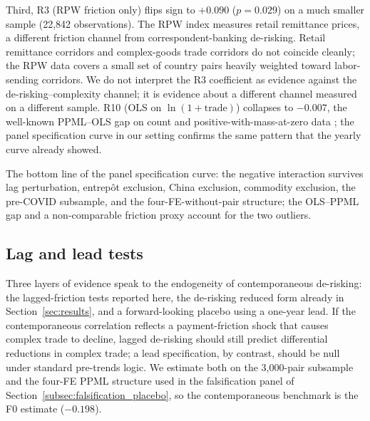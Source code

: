Third, R3 (RPW friction only) flips sign to $+0.090$ ($p = 0.029$) on a much smaller sample (22{,}842 observations). The RPW index measures retail remittance prices, a different friction channel from correspondent-banking de-risking. Retail remittance corridors and complex-goods trade corridors do not coincide cleanly; the RPW data covers a small set of country pairs heavily weighted toward labor-sending corridors. We do not interpret the R3 coefficient as evidence against the de-risking--complexity channel; it is evidence about a different channel measured on a different sample. R10 (OLS on $\ln(1+\text{trade})$) collapses to $-0.007$, the well-known PPML--OLS gap on count and positive-with-mass-at-zero data \citep{SantosSilva2006_ppml}; the panel specification curve in our setting confirms the same pattern that the yearly curve already showed.

The bottom line of the panel specification curve: the negative interaction survives lag perturbation, entrep\^ot exclusion, China exclusion, commodity exclusion, the pre-COVID subsample, and the four-FE-without-pair structure; the OLS--PPML gap and a non-comparable friction proxy account for the two outliers.

\subsection{Lag and lead tests}
\label{subsec:lags_leads}

Three layers of evidence speak to the endogeneity of contemporaneous de-risking: the lagged-friction tests reported here, the de-risking reduced form already in Section~\ref{sec:results}, and a forward-looking placebo using a one-year lead. If the contemporaneous correlation reflects a payment-friction shock that causes complex trade to decline, lagged de-risking should still predict differential reductions in complex trade; a lead specification, by contrast, should be null under standard pre-trends logic. We estimate both on the 3{,}000-pair subsample and the four-FE PPML structure used in the falsification panel of Section~\ref{subsec:falsification_placebo}, so the contemporaneous benchmark is the F0 estimate ($-0.198$).


